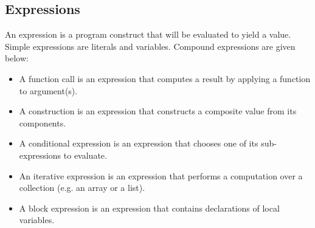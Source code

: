 \documentclass[a4paper, openany]{memoir}
\begin{document}
\subsection{Expressions}
An expression is a program construct that will be evaluated to yield a value. Simple expressions are literals and variables. Compound expressions are given below:
\begin{itemize}
    \item A function call is an expression that computes a result by applying a function to argument(s).
    \item A construction is an expression that constructs a composite value from its components.
    \item A conditional expression is an expression that chooses one of its sub-expressions to evaluate.
    \item An iterative expression is an expression that performs a computation over a collection (e.g. an array or a list).
    \item A block expression is an expression that contains declarations of local variables.
\end{itemize}
\end{document}
